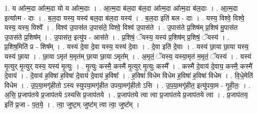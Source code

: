 \documentclass[17pt]{extarticle}
\begin{document}
1. य आ᳚त्म॒दा आ᳚त्म॒दा यो य आ᳚त्म॒दाः । . आ॒त्म॒दा ब॑ल॒दा ब॑ल॒दा आ᳚त्म॒दा आ᳚त्म॒दा ब॑ल॒दाः । . आ॒त्म॒दा इत्या᳚त्म - दाः । . ब॒ल॒दा यस्य॒ यस्य॑ बल॒दा ब॑ल॒दा यस्य॑ । . ब॒ल॒दा इति॑ बल - दाः । . यस्य॒ विश्वे॒ विश्वे॒ यस्य॒ यस्य॒ विश्वे᳚ । . विश्व॑ उ॒पास॑त उ॒पास॑ते॒ विश्वे॒ विश्व॑ उ॒पास॑ते । . उ॒पास॑ते प्र॒शिष॑म् प्र॒शिष॑ मु॒पास॑त उ॒पास॑ते प्र॒शिष᳚म् । . उ॒पास॑त॒ इत्यु॑प - आस॑ते । . प्र॒शिषं॒ ॅयस्य॒ यस्य॑ प्र॒शिष॑म् प्र॒शिषं॒ ॅयस्य॑ । . प्र॒शिष॒मिति॑ प्र - शिष᳚म् । . यस्य॑ दे॒वा दे॒वा यस्य॒ यस्य॑ दे॒वाः । . दे॒वा इति॑ दे॒वाः । . यस्य॑ छा॒या छा॒या यस्य॒ यस्य॑ छा॒या । . छा॒या ऽमृत॑ म॒मृत॑म् छा॒या छा॒या ऽमृत᳚म् । . अ॒मृतं॒ ॅयस्य॒ यस्या॒मृत॑ म॒मृतं॒ ॅयस्य॑ । . यस्य॑ मृ॒त्युर् मृ॒त्युर् यस्य॒ यस्य॑ मृ॒त्युः । . मृ॒त्युः कस्मै॒ कस्मै॑ मृ॒त्युर् मृ॒त्युः कस्मै᳚ । . कस्मै॑ दे॒वाय॑ दे॒वाय॒ कस्मै॒ कस्मै॑ दे॒वाय॑ । . दे॒वाय॑ ह॒विषा॑ ह॒विषा॑ दे॒वाय॑ दे॒वाय॑ ह॒विषा᳚ । . ह॒विषा॑ विधेम विधेम ह॒विषा॑ ह॒विषा॑ विधेम । . वि॒धे॒मेति॑ विधेम । . उ॒प॒या॒मगृ॑हीतो ऽस्य स्युपया॒मगृ॑हीत उपया॒मगृ॑हीतो ऽसि । . उ॒प॒या॒मगृ॑हीत॒ इत्यु॑पया॒म - गृ॒ही॒तः॒ । . अ॒सि॒ प्र॒जाप॑तये प्र॒जाप॑तये ऽस्यसि प्र॒जाप॑तये । . प्र॒जाप॑तये त्वा त्वा प्र॒जाप॑तये प्र॒जाप॑तये त्वा । . प्र॒जाप॑तय॒ इति॑ प्र॒जा - प॒त॒ये॒ । . त्वा॒ जुष्ट॒म् जुष्ट॑म् त्वा त्वा॒ जुष्ट᳚म् । \newline
\end{document}
